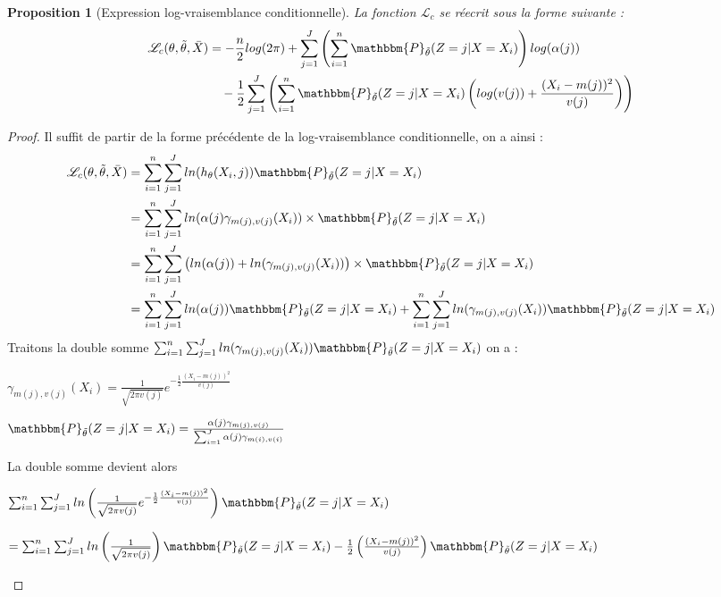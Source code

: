 \documentclass[frenchb]{report}
\newcommand{\1}{\mathbbm{1}}
\newcommand{\prob}{\mathbbm{P}}
\newcommand{\lv}{\mathcal{L}}
\newcommand{\thetat}{\tilde{\theta}}
\newtheorem{prop}{Proposition}
\theoremstyle{definition}\newtheorem{defn}{Définition}
\theoremstyle{definition}\newtheorem{exm}{Exemple}
\theoremstyle{definition}\newtheorem{nota}{Notation}
\theoremstyle{definition}\newtheorem{rem}{Remarque}
\begin{document}
\begin{prop}[Expression log-vraisemblance conditionnelle] La fonction $\lv_{c}$ se réecrit sous la forme suivante : 
\begin{align*}
 \lv_{c}(\theta, \thetat, \bar{X}) &= -\frac{n}{2}log(2\pi)+\sum_{j=1}^J \left(\sum_{i = 1}^n \prob_{\thetat}(Z= j|X=X_i)\right) log(\alpha(j))\\
&~~~-\frac{1}{2}\sum_{j=1}^J\left(\sum_{i=1}^n  \prob_{\thetat}(Z=j|X=X_i)\left(log(v(j))+\frac{(X_i-m(j))^2}{v(j)}\right)\right)
\end{align*}
\end{prop}

\begin{proof}
Il suffit de partir de la forme précédente de la log-vraisemblance conditionnelle, on a ainsi : 
\begin{align*}
 \lv_{c}(\theta, \thetat, \bar{X}) &= \sum_{i=1}^n \sum_{j = 1}^J ln(h_\theta(X_i,j)) \prob_{\thetat} (Z = j|X = X_i)\\
&= \sum_{i=1}^n \sum_{j = 1}^J ln(\alpha(j)\gamma_{m(j),v(j)}(X_i))\times \prob_{\thetat} (Z = j|X = X_i)\\
&= \sum_{i=1}^n \sum_{j = 1}^J \left(ln(\alpha(j))+ln(\gamma_{m(j),v(j)}(X_i))\right)\times \prob_{\thetat} (Z = j|X = X_i)\\
&= \sum_{i=1}^n \sum_{j = 1}^J ln(\alpha(j))\prob_{\thetat} (Z = j|X = X_i)+\sum_{i=1}^n \sum_{j = 1}^J ln(\gamma_{m(j),v(j)}(X_i))\prob_{\thetat} (Z = j|X = X_i)\\
\end{align*}
Traitons la double somme 
$\sum_{i=1}^n \sum_{j = 1}^J ln(\gamma_{m(j),v(j)}(X_i))\prob_{\thetat} (Z = j|X = X_i)$
on a :
\begin{center}
$\gamma_{m(j),v(j)}(X_i) = \frac{1}{\sqrt{2 \pi v(j)}}e^{-\frac{1}{2}\frac{(X_i - m(j))^2}{v(j)}}$
\end{center}
\begin{center}
$\prob_{\thetat} (Z = j|X = X_i) = \frac{\alpha(j)\gamma_{m(j),v(j)}}{\sum_{i=1}^J \alpha(j)\gamma_{m(i),v(i)}}$
\end{center}
La double somme devient alors 
\begin{center}
$\sum_{i=1}^n \sum_{j = 1}^J ln\left(\frac{1}{\sqrt{2 \pi v(j)}}e^{-\frac{1}{2}\frac{(X_i - m(j))^2}{v(j)}}\right)\prob_{\thetat} (Z = j|X = X_i)$
\end{center}
\begin{center}
$=\sum_{i=1}^n \sum_{j = 1}^J ln\left(\frac{1}{\sqrt{2 \pi v(j)}}\right)\prob_{\thetat} (Z = j|X = X_i) -\frac{1}{2}\left(\frac{(X_i - m(j))^2}{v(j)}\right)\prob_{\thetat} (Z = j|X = X_i) $

\end{center}
\end{proof}
\end{document}
